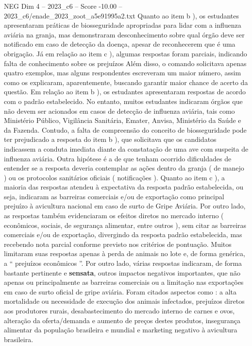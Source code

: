 \begin{textsample}{NEG Dim 4 – 2023\_c6 – Score -10.00 – 2023\_c6/enade\_2023\_zoot\_a5e91995a2.txt}
Quanto ao item b ), os estudantes apresentaram práticas de biosseguridade apropriadas para lidar com a influenza aviária na granja, mas demonstraram desconhecimento sobre qual órgão deve ser notificado em caso de detecção da doença, apesar de reconhecerem que é uma obrigação.
Já em relação ao item c ), algumas respostas foram parciais, indicando falta de conhecimento sobre os prejuízos Além disso, o comando solicitava apenas quatro exemplos, mas alguns respondentes escreveram um maior número, assim como os explicaram, aparentemente, buscando garantir maior chance de acerto da questão.
Em relação ao item b ), os estudantes apresentaram respostas de acordo com o padrão estabelecido.
No entanto, muitos estudantes indicaram órgãos que não devem ser acionados em casos de detecção de influenza aviária, tais como Ministério Público, Vigilância Sanitária, Emater, Anvisa, Ministério da Saúde e da Fazenda.
Contudo, a falta de compreensão do conceito de biosseguridade pode ter prejudicado a resposta do item b ), que solicitava que os candidatos indicassem a conduta imediata diante da constatação de uma ave com suspeita de influenza aviária.
Outra hipótese é a de que tenham ocorrido dificuldades de entender se a resposta deveria contemplar as ações dentro da granja ( de manejo ) ou os protocolos sanitários oficiais ( notificações ).
Quanto ao item c ), a maioria das respostas atendeu à expectativa da resposta padrão estabelecida, ou seja, indicaram as barreiras comerciais e/ou de exportação como principal prejuízo à avicultura nacional em caso de surto de Gripe Aviária.
Por outro lado, as respostas também evidenciaram os efeitos diretos no mercado interno ( econômicos, sociais, de segurança alimentar, entre outros ), sem citar as barreiras comerciais e/ou de exportação, divergindo da resposta padrão estabelecida, mas recebendo nota parcial conforme previsto nos critérios de pontuação.
Muitos limitaram suas respostas apenas à perda de animais no lote e, de forma genérica, a “ prejuízos econômicos ”.
Por outro lado, várias respostas indicaram, de forma bastante pertinente e \textbf{sensata}, outros impactos negativos importantes, que não apenas ou principalmente as barreiras comerciais ou a limitação nas exportações em caso de surto oficial de gripe aviária.
Foram citados aspectos como : a alta mortalidade ou necessidade de execução dos animais infectados, prejuízos diretos aos produtores rurais, desabastecimento do mercado interno de carnes e ovos, alteração da oferta/demanda e aumento de preços destes produtos, insegurança alimentar da população brasileira e mundial e marketing negativo à avicultura brasileira.

\end{textsample}
